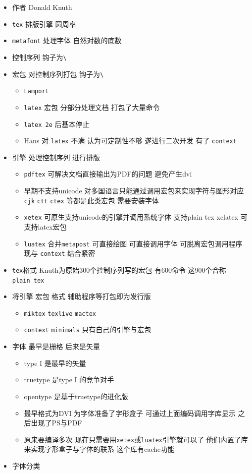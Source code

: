 \documentclass[]{book}
\begin{document}
\begin{itemize}
\item
  作者 Donald Knuth
\item
  \texttt{tex} 排版引擎 圆周率
\item
  \texttt{metafont} 处理字体 自然对数的底数
\item
  控制序列 钩子为\texttt{\textbackslash{}}
\item
  宏包 对控制序列打包 钩子为\texttt{\textbackslash{}}

  \begin{itemize}
  \item
    \texttt{Lamport}
  \item
    \texttt{latex} 宏包 分部分处理文档 打包了大量命令
  \item
    \texttt{latex\ 2e} 后基本停止
  \item
    Hans 对 \texttt{latex} 不满 认为可定制性不够 遂进行二次开发 有了 \texttt{context}
  \end{itemize}
\item
  引擎 处理控制序列 进行排版

  \begin{itemize}
  \item
    \texttt{pdftex} 可解决文档直接输出为PDF的问题 避免产生dvi
  \item
    早期不支持unicode 对多国语言只能通过调用宏包来实现字符与图形对应 \texttt{cjk} \texttt{ctt} \texttt{ctex} 等都是此类宏包 需要安装字体
  \item
    \texttt{xetex} 可原生支持unicode的引擎并调用系统字体 支持plain tex xelatex 可支持latex宏包
  \item
    \texttt{luatex} 合并\texttt{metapost} 可直接绘图 可直接调用字体 可脱离宏包调用程序 现与 \texttt{context} 结合紧密
  \end{itemize}
\item
  \texttt{tex}格式 Knuth为原始300个控制序列写的宏包 有600命令 这900个合称\texttt{plain\ tex}
\item
  将引擎 宏包 格式 辅助程序等打包即为发行版

  \begin{itemize}
  \item
    \texttt{miktex} \texttt{texlive} \texttt{mactex}
  \item
    \texttt{context} \texttt{minimals} 只有自己的引擎与宏包
  \end{itemize}
\item
  字体 最早是栅格 后来是矢量

  \begin{itemize}
  \item
    type I 是最早的矢量
  \item
    truetype 是type I 的竞争对手
  \item
    opentype 是基于truetype的进化版
  \item
    最早格式为DVI 为字体准备了字形盒子 可通过上面编码调用字库显示 之后出现了PS与PDF
  \item
    原来要编译多次 现在只需要用\texttt{xetex}或\texttt{luatex}引擎就可以了 他们内置了库来实现字形盒子与字体的联系 这个库有cache功能
  \end{itemize}
\item
  字体分类


\end{itemize}
\end{document}
